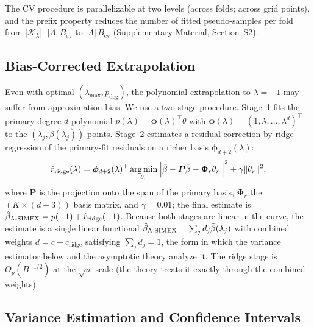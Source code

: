 \documentclass[3p,11pt]{elsarticle}
\theoremstyle{plain}
\theoremstyle{definition}
\newcommand{\bPhi}{\bm{\Phi}}
\newcommand{\bphi}{\bm{\phi}}
\DeclareMathOperator*{\argmin}{arg\,min}
\newcommand{\asimex}{\textup{A-SIMEX}}
\begin{document}
The CV procedure is parallelizable at two levels (across folds; across
grid points), and the prefix property reduces the number of fitted
pseudo-samples per fold from
$|\mathcal K_\lambda|\cdot|\Lambda|\,B_{\mathrm{cv}}$ to
$|\Lambda|\,B_{\mathrm{cv}}$ (Supplementary Material, Section~S2).

\subsection{Bias-Corrected Extrapolation}\label{sec:ridge}

Even with optimal $(\lambda_{\max},p_{\mathrm{deg}})$, the polynomial
extrapolation to $\lambda=-1$ may suffer from approximation bias. We
use a two-stage procedure. Stage~1 fits the primary degree-$d$
polynomial $p(\lambda)=\bphi(\lambda)^\top\theta$ with
$\bphi(\lambda)=(1,\lambda,\dots,\lambda^d)^\top$ to the
$(\lambda_j,\bar\beta(\lambda_j))$ points. Stage~2 estimates a
residual correction by ridge regression of the primary-fit residuals
on a richer basis $\bphi_{d+2}(\lambda)$:
\begin{equation}\label{eq:ridge}
  \hat r_{\mathrm{ridge}}(\lambda)=\bphi_{d+2}(\lambda)^\top
  \argmin_{\theta_r}\Bigl\|\bar\beta-\bm P\bar\beta
  -\bPhi_r\theta_r\Bigr\|^2
  +\gamma\|\theta_r\|^2,
\end{equation}
where $\bm P$ is the projection onto the span of the primary basis,
$\bPhi_r$ the $(K\times(d+3))$ basis matrix, and $\gamma=0.01$; the
final estimate is
$\hat\beta_{\asimex}=p(-1)+\hat r_{\mathrm{ridge}}(-1)$. Because both
stages are linear in the curve, the estimate is a single linear
functional $\hat\beta_{\asimex}=\sum_jd_j\bar\beta(\lambda_j)$ with
combined weights $d=c+c_{\mathrm{ridge}}$ satisfying
$\sum_jd_j=1$, the form in which the variance estimator below and
the asymptotic theory analyze it. The ridge stage is $O_p(B^{-1/2})$
at the $\sqrt n$ scale (the theory treats it exactly through the
combined weights).

\subsection{Variance Estimation and Confidence Intervals}\label{sec:var}
\end{document}
